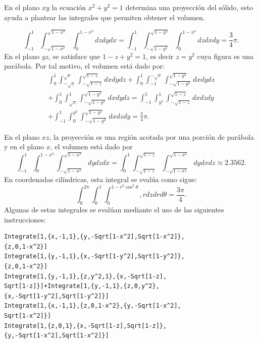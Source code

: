 En el plano $xy$ la ecuación $x^2+y^2=1$ determina una proyección del sólido, esto ayuda a plantear las integrales que permiten obtener el volumen.

\[\int_{-1}^{1}\int_{-\sqrt{1-x^2}}^{\sqrt{1-x^2}}\int_{0}^{1-x^2}dzdydx= \int_{-1}^{1}\int_{-\sqrt{1-y^2}}^{\sqrt{1-y^2}}\int_{0}^{1-x^2}dzdxdy= \frac{3}{4}\pi.\]
%
En el plano $yz$, se satisface que $1-z+y^2=1$, es decir $z=y^2$ cuya figura es una parábola. Por tal motivo, el volumen está dado por:
\begin{multline*}
\int_{0}^{1}\int_{-\sqrt{z}}^{\sqrt{z}}\int_{-\sqrt{1-z}}^{\sqrt{1-z}}dxdydz +\int_{0}^{1}\int_{-1}^{-\sqrt{z}}\int_{-\sqrt{1-y^2}}^{\sqrt{1-y^2}}dxdydz \\ +\int_{0}^{1}\int_{\sqrt{z}}^{1}\int_{-\sqrt{1-y^2}}^{\sqrt{1-y^2}}dxdydz
=\int_{-1}^1\int_{y^2}^1\int_{-\sqrt{1-z}}^{\sqrt{1-z}}dxdzdy \\ +\int_{-1}^{1}\int_0^{y^2}\int_{-\sqrt{1-y^2}}^{\sqrt{1-y^2}}dxdzdy=\frac{3}{4}\pi.
\end{multline*}

En el plano $xz$, la proyección es una región acotada por una porción de parábola y en el plano $x$,
el volumen está dado por
%
\[\int_{-1}^{1}\int_{0}^{1-x^2}\int_{-\sqrt{1-x^2}}^{\sqrt{1-x^2}}dydzdx = \int_{0}^{1}\int_{-\sqrt{1-z}}^{\sqrt{1-z}}\int_{-\sqrt{1-x^2}}^{\sqrt{1-x^2}}dydxdz \approx 2.3562.\]
%
En coordenadas cilíndricas, esta integral se evalúa como sigue:
%
\[\int_0^{2\pi} \int_0^1 \int_0^{1-r^2\cos^2 \theta}, r dzdrd \theta =\frac{3\pi}{4}.\]
%
Algunas de estas integrales se evalúan mediante el uso de las siguientes instrucciones:

\begin{tcolorbox}[title=\bf Instrucción en \verb"Mathematica"]\begin{Verbatim}[formatcom=\letraverbatim]
Integrate[1,{x,-1,1},{y,-Sqrt[1-x^2],Sqrt[1-x^2]},
{z,0,1-x^2}]
Integrate[1,{y,-1,1},{x,-Sqrt[1-y^2],Sqrt[1-y^2]},
{z,0,1-x^2}]
Integrate[1,{y,-1,1},{z,y^2,1},{x,-Sqrt[1-z],
Sqrt[1-z]}]+Integrate[1,{y,-1,1},{z,0,y^2},
{x,-Sqrt[1-y^2],Sqrt[1-y^2]}]
Integrate[1,{x,-1,1},{z,0,1-x^2},{y,-Sqrt[1-x^2],
Sqrt[1-x^2]}]
Integrate[1,{z,0,1},{x,-Sqrt[1-z],Sqrt[1-z]},
{y,-Sqrt[1-x^2],Sqrt[1-x^2]}]
\end{Verbatim}
\end{tcolorbox}

